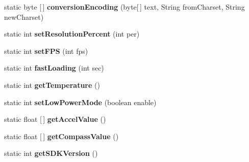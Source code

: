 \begin{DoxyCompactItemize}
static byte \mbox{[}$\,$\mbox{]} {\bfseries conversion\+Encoding} (byte\mbox{[}$\,$\mbox{]} text, String from\+Charset, String new\+Charset)
\item 
\mbox{\label{classorg_1_1cocos2dx_1_1lib_1_1Cocos2dxHelper_ad8e624ba346c9c987350dbbd87ccb826}} 
static int {\bfseries set\+Resolution\+Percent} (int per)
\item 
\mbox{\label{classorg_1_1cocos2dx_1_1lib_1_1Cocos2dxHelper_a54a0b8d649686dbe3e4d44a56f1dd072}} 
static int {\bfseries set\+F\+PS} (int fps)
\item 
\mbox{\label{classorg_1_1cocos2dx_1_1lib_1_1Cocos2dxHelper_affbc22f54741a607ae460c6580e9f26c}} 
static int {\bfseries fast\+Loading} (int sec)
\item 
\mbox{\label{classorg_1_1cocos2dx_1_1lib_1_1Cocos2dxHelper_aeff3c65fd5ec0701fd7cfe420b699692}} 
static int {\bfseries get\+Temperature} ()
\item 
\mbox{\label{classorg_1_1cocos2dx_1_1lib_1_1Cocos2dxHelper_a8cadded2901730d66d784cfb8c1dc900}} 
static int {\bfseries set\+Low\+Power\+Mode} (boolean enable)
\item 
\mbox{\label{classorg_1_1cocos2dx_1_1lib_1_1Cocos2dxHelper_a39229a8eb13726c97fddcb0c8f60456a}} 
static float \mbox{[}$\,$\mbox{]} {\bfseries get\+Accel\+Value} ()
\item 
\mbox{\label{classorg_1_1cocos2dx_1_1lib_1_1Cocos2dxHelper_a78347df5793151d0dbe72ba0c74185d1}} 
static float \mbox{[}$\,$\mbox{]} {\bfseries get\+Compass\+Value} ()
\item 
\mbox{\label{classorg_1_1cocos2dx_1_1lib_1_1Cocos2dxHelper_a90f8c4b241015f35df44a637978d2cf0}} 
static int {\bfseries get\+S\+D\+K\+Version} ()
\item 
\mbox{\label{classorg_1_1cocos2dx_1_1lib_1_1Cocos2dxHelper_a132bf82f4a49a53c3c7f71eb4fdff10e}} 

\end{DoxyCompactItemize}
